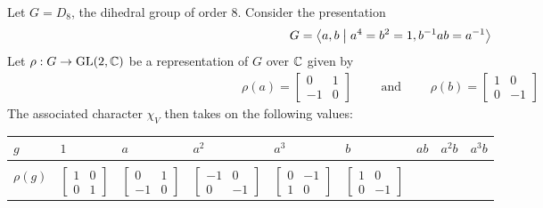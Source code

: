 \begin{boxexample}
    Let $G = D_8$, the dihedral group of order $8$. Consider the presentation
    \begin{align*}
        G = \left\langle a, b \; \middle| \; a^4 = b^2 = 1, b^{-1} a b = a^{-1} \right\rangle
    \end{align*}
    Let $\rho : G \to \operatorname{GL}\!\left( 2, \mathbb{C} \right)$ be a representation of $G$ over $\mathbb{C}$ given by
    \begin{align*}
        \rho(a) = \begin{bmatrix}
            0 & 1 \\ -1 & 0
        \end{bmatrix}
        \quad\quad \text{ and } \quad\quad
        \rho(b) = \begin{bmatrix}
            1 & 0 \\ 0 & -1
        \end{bmatrix}
    \end{align*}
    The associated character $\chi_V$ then takes on the following values:
    \begin{table}[H]
        \centering
        \hspace{-0.4cm}
        \begin{tabular}{C{1.1cm}|C{1.1cm} C{1.38cm} C{1.67cm} C{1.38cm} C{1.38cm} C{1.67cm} C{1.38cm} C{1.1cm}}
            $g$ & $1$ & $a$ & $a^2$ & $a^3$ & $b$ & $ab$ & $a^2 b$ & $a^3 b$ \\
            \hline \\[-11pt]
            $\rho(g)$ & \footnotesize 
            $\begin{bmatrix} 1 & 0 \\ 0 & 1 \end{bmatrix}$
            & \footnotesize
            $\begin{bmatrix} 0 & 1 \\ -1 & 0 \end{bmatrix}$
            & \footnotesize
            $\begin{bmatrix} -1 & 0 \\ 0 & -1 \end{bmatrix}$
            & \footnotesize
            $\begin{bmatrix} 0 & -1 \\ 1 & 0 \end{bmatrix}$
            & \footnotesize
            $\begin{bmatrix} 1 & 0 \\ 0 & -1 \end{bmatrix}$

\end{tabular}
\end{table}
\end{boxexample}
